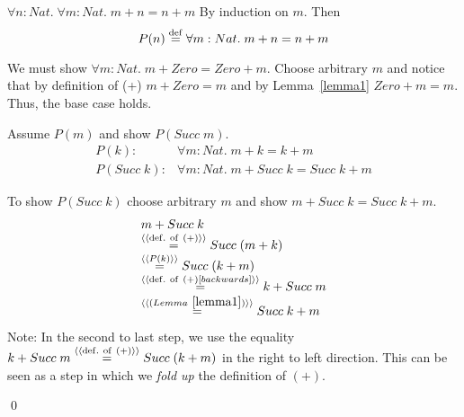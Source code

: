 \documentclass[11pt]{article}
\newcommand{\s}{{Succ\;}}
\begin{document}
\begin{theorem} $\forall{}n: Nat.\; \forall {} m: Nat .\; m + n = n + m $
\Proof By induction on $m$. Then \[P(n)\;{\stackrel{\rm def}{=}}\; \forall {} m: Nat .\; m + n = n + m \] 

\CASE[$P(Zero)$] We must show $\forall {} m: Nat .\; m + Zero = Zero + m
$. Choose arbitrary $m$ and notice that by definition of (+) $m + Zero = m$ and
by Lemma~\ref{lemma1} $Zero + m = m$.  Thus, the base case holds.



\CASE[$P(\s m)$] Assume $P(m)$ and show $P(\s m)$.
\[\begin{array}{rl}
P(k) :&  \forall {} m: Nat .\; m + k = k + m \\
P(\s k):&  \forall {} m: Nat .\; m + \s k = \s k + m  
\end{array}\]

To show $P(\s k)$ choose arbitrary $m$ and show $m + \s k = \s k + m$.
\[\begin{array}{l}
m + \s k \\
\byDef{(+)} \s (m + k)  \\
\byEq{P(k)} \s(k + m) \\
\byDef{(+)[backwards]} k + \s m  \\
\byEq{(Lemma~{\ref{lemma1}})} \s k + m\\
\end{array}\]
Note: In the second to last step, we use the equality $ k + \s m \byDef{(+)}
\s(k + m)$ in the right to left direction. This can be seen as a step in which
we {\em{fold up}} the definition of $(+)$.

\qed
\end{theorem}
\end{document}
